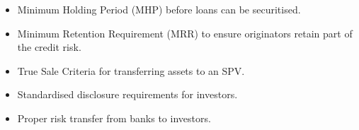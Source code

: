 \begin{itemize}
	
	\item Minimum Holding Period (MHP) before loans can be securitised.
	
	\item Minimum Retention Requirement (MRR) to ensure originators retain part of the credit risk.
	
	\item True Sale Criteria for transferring assets to an SPV.
	
	\item Standardised disclosure requirements for investors.
	
	\item Proper risk transfer from banks to investors.
	
\end{itemize}
